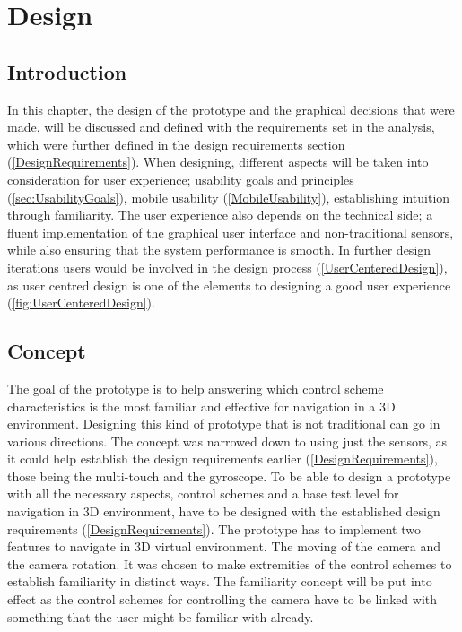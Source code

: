 \chapter{Design}
\section{Introduction}
In this chapter, the design of the prototype and the graphical decisions that were made, will be discussed and defined with the requirements set in the analysis, which were further defined in the design requirements section (\ref{DesignRequirements}). When designing, different aspects will be taken into consideration for user experience; usability goals and principles (\ref{sec:UsabilityGoals}), mobile usability (\ref{MobileUsability}), establishing intuition through familiarity. The user experience also depends on the technical side; a fluent implementation of the graphical user interface and non-traditional sensors, while also ensuring that the system performance is smooth. In further design iterations users would be involved in the design process (\ref{UserCenteredDesign}), as user centred design is one of the elements to designing a good user experience (\ref{fig:UserCenteredDesign}).

\section{Concept}
The goal of the prototype is to help answering which control scheme characteristics is the most familiar and effective for navigation in a 3D environment. Designing this kind of prototype that is not traditional can go in various directions. The concept was narrowed down to using just the sensors, as it could help establish the design requirements earlier (\ref{DesignRequirements}), those being the multi-touch and the gyroscope.
To be able to design a prototype with all the necessary aspects, control schemes and a base test level for navigation in 3D environment, have to be designed with the established design requirements (\ref{DesignRequirements}).
The prototype has to implement two features to navigate in 3D virtual environment. The moving of the camera and the camera rotation. It was chosen to make extremities of the control schemes to establish familiarity in distinct ways. The familiarity concept will be put into effect as the control schemes for controlling the camera have to be linked with something that the user might be familiar with already. 

